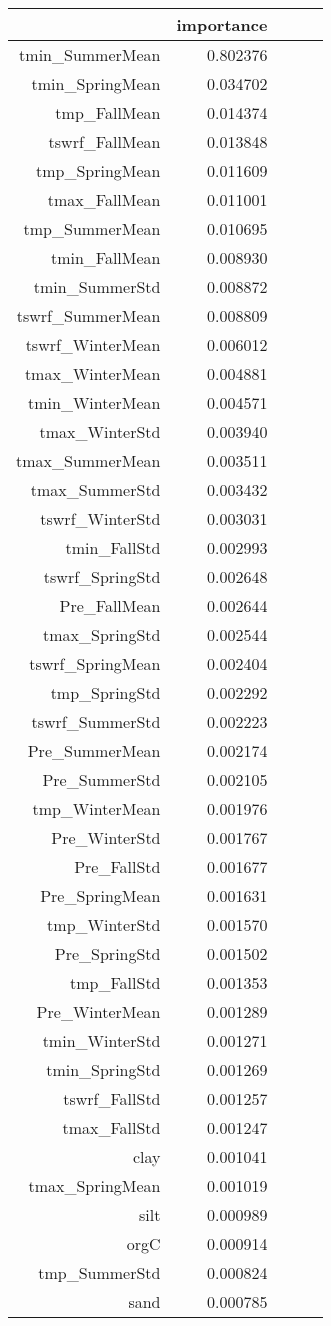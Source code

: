 \begin{tabular}{rrrrr}
\toprule
 & importance \\
\midrule
tmin_SummerMean & 0.802376 \\
tmin_SpringMean & 0.034702 \\
tmp_FallMean & 0.014374 \\
tswrf_FallMean & 0.013848 \\
tmp_SpringMean & 0.011609 \\
tmax_FallMean & 0.011001 \\
tmp_SummerMean & 0.010695 \\
tmin_FallMean & 0.008930 \\
tmin_SummerStd & 0.008872 \\
tswrf_SummerMean & 0.008809 \\
tswrf_WinterMean & 0.006012 \\
tmax_WinterMean & 0.004881 \\
tmin_WinterMean & 0.004571 \\
tmax_WinterStd & 0.003940 \\
tmax_SummerMean & 0.003511 \\
tmax_SummerStd & 0.003432 \\
tswrf_WinterStd & 0.003031 \\
tmin_FallStd & 0.002993 \\
tswrf_SpringStd & 0.002648 \\
Pre_FallMean & 0.002644 \\
tmax_SpringStd & 0.002544 \\
tswrf_SpringMean & 0.002404 \\
tmp_SpringStd & 0.002292 \\
tswrf_SummerStd & 0.002223 \\
Pre_SummerMean & 0.002174 \\
Pre_SummerStd & 0.002105 \\
tmp_WinterMean & 0.001976 \\
Pre_WinterStd & 0.001767 \\
Pre_FallStd & 0.001677 \\
Pre_SpringMean & 0.001631 \\
tmp_WinterStd & 0.001570 \\
Pre_SpringStd & 0.001502 \\
tmp_FallStd & 0.001353 \\
Pre_WinterMean & 0.001289 \\
tmin_WinterStd & 0.001271 \\
tmin_SpringStd & 0.001269 \\
tswrf_FallStd & 0.001257 \\
tmax_FallStd & 0.001247 \\
clay & 0.001041 \\
tmax_SpringMean & 0.001019 \\
silt & 0.000989 \\
orgC & 0.000914 \\
tmp_SummerStd & 0.000824 \\
sand & 0.000785 \\
\bottomrule
\end{tabular}
